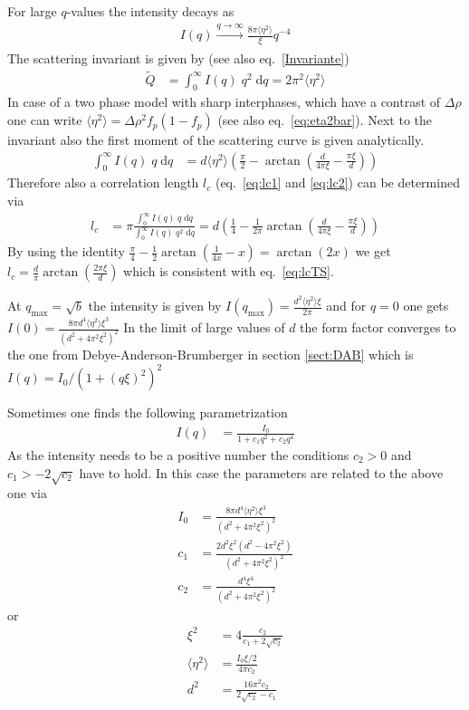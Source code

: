 For large $q$-values the intensity decays as
\begin{align}
I(q)\xrightarrow[]{q\rightarrow\infty} \frac{8\pi\langle\eta^2\rangle}{\xi} q^{-4}
\label{eq:TSc4}
\end{align}
The scattering invariant is given by (see also eq.\ \ref{Invariante})
\begin{align}
\widetilde{Q} &= \int_0^\infty I(q)\; q^2 \;\mathrm{d}q = 2\pi^2 \langle\eta^2\rangle
\end{align}
In case of a two phase model with sharp interphases, which have a contrast of $\Delta\rho$
one can write $\langle\eta^2\rangle=\Delta\rho^2 f_p(1-f_p)$ (see also eq.\ \ref{eq:eta2bar}).
Next to the invariant also the first moment of the scattering curve is given analytically.
\begin{align}
      \int_0^\infty I(q)\; q \;\mathrm{d}q &=
       d \langle\eta^2\rangle \left(\frac{\pi}{2} -\arctan\left(\frac{d}{4 \pi  \xi }-\frac{\pi  \xi }{d}\right)\right)
\end{align}
Therefore also a correlation length $l_c$ (eq.\ \ref{eq:lc1} and \ref{eq:lc2}) can be determined via
\begin{align}
l_c &= \pi\frac{\int_0^\infty I(q)\; q \;\mathrm{d}q}{\int_0^\infty I(q)\; q^2 \;\mathrm{d}q}
     = d \left(\frac{1}{4} -\frac{1}{2\pi}\arctan\left(\frac{d}{4 \pi  \xi }-\frac{\pi  \xi }{d}\right)\right)
\end{align}
By using the identity $\frac{\pi}{4}-\frac{1}{2}\arctan\left(\frac{1}{4x}-x\right) = \arctan(2x)$ we get
$l_c = \frac{d}{\pi} \arctan\left(\frac{2 \pi  \xi }{d}\right)$ which is consistent with eq.\ \ref{eq:lcTS}.

At $q_\text{max}=\sqrt{b}$ the intensity is given by
$I(q_\text{max})=\frac{d^2\langle\eta^2\rangle \xi}{2\pi}$
and for $q=0$ one gets $I(0)=\frac{8\pi d^4\langle\eta^2\rangle\xi^3}{(d^2+4\pi^2\xi^2)^2}$
In the limit of large values of $d$ the form factor converges to the one from
Debye-Anderson-Brumberger in section \ref{sect:DAB} which is $I(q)=I_0/(1+(q\xi)^2)^2$

Sometimes one finds the following parametrization
\begin{align}
I(q) &= \frac{I_0}{1+c_1 q^2 + c_2 q^4}
\end{align}
As the intensity needs to be a positive number the conditions $c_2>0$ and $c_1>-2\sqrt{c_2}$ have to hold.
In this case the parameters are related to the above one via
\begin{align}
I_0 &= \frac{8 \pi  d^4 \langle\eta^2\rangle \xi^3}{\left(d^2+4 \pi^2 \xi^2\right)^2} \\
c_1 &=  \frac{2 d^2 \xi^2 \left(d^2-4 \pi^2 \xi^2\right)}{\left(d^2+4 \pi^2 \xi^2\right)^2} \\
c_2 &= \frac{d^4 \xi^4}{\left(d^2+4 \pi^2 \xi^2\right)^2}
\end{align}
or
\begin{align}
\xi^2 &= 4\frac{c_2}{c_1+2 \sqrt{c_2}} \\
\langle\eta^2\rangle &= \frac{I_0 \xi/2}{4 \pi  c_2} \\
d^2 &= \frac{16 \pi ^2 c_2}{2 \sqrt{c_2}-c_1}
\end{align}


